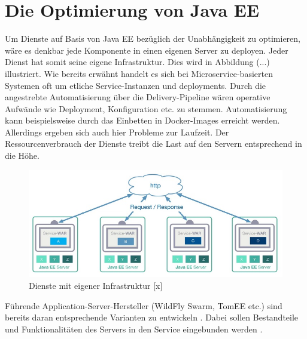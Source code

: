 \section{Die Optimierung von Java EE}
Um Dienste auf Basis von Java EE bezüglich der Unabhängigkeit zu optimieren, wäre es denkbar jede Komponente in einen eigenen Server zu deployen. Jeder Dienst hat somit seine eigene Infrastruktur. Dies wird in Abbildung (...) illustriert. Wie bereits erwähnt handelt es sich bei Microservice-basierten Systemen oft um etliche Service-Instanzen und deployments. Durch die angestrebte Automatisierung über die Delivery-Pipeline wären operative Aufwände wie Deployment, Konfiguration etc. zu stemmen. Automatisierung kann beispielsweise durch das Einbetten in Docker-Images erreicht werden. Allerdings ergeben sich auch hier Probleme zur Laufzeit. Der Ressourcenverbrauch der Dienste treibt die Last auf den Servern entsprechend in die Höhe.
  

\begin{figure}[h!]
	\centering
	\includegraphics[width=1.0\linewidth]{images/mp2}
	\caption{Dienste mit eigener Infrastruktur [x]}
	\label{fig:mp2}
\end{figure}


Führende Application-Server-Hersteller (WildFly Swarm, TomEE etc.) sind bereits daran entsprechende Varianten zu entwickeln \cite{LarsRowekamp.2016}. Dabei sollen Bestandteile und Funktionalitäten des Servers in den Service eingebunden werden \cite{jaxcenter.2016}.


